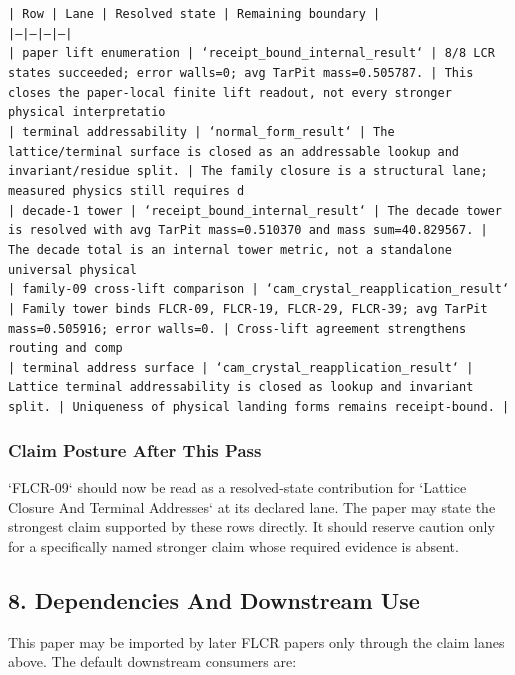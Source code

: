 \documentclass[11pt]{article}
\begin{document}
\noindent\texttt{| Row | Lane | Resolved state | Remaining boundary |}\\
\noindent\texttt{|---|---|---|---|}\\
\noindent\texttt{| paper lift enumeration | `receipt\_bound\_internal\_result` | 8/8 LCR states succeeded; error walls=0; avg TarPit mass=0.505787. | This closes the paper-local finite lift readout, not every stronger physical interpretatio}\\
\noindent\texttt{| terminal addressability | `normal\_form\_result` | The lattice/terminal surface is closed as an addressable lookup and invariant/residue split. | The family closure is a structural lane; measured physics still requires d}\\
\noindent\texttt{| decade-1 tower | `receipt\_bound\_internal\_result` | The decade tower is resolved with avg TarPit mass=0.510370 and mass sum=40.829567. | The decade total is an internal tower metric, not a standalone universal physical }\\
\noindent\texttt{| family-09 cross-lift comparison | `cam\_crystal\_reapplication\_result` | Family tower binds FLCR-09, FLCR-19, FLCR-29, FLCR-39; avg TarPit mass=0.505916; error walls=0. | Cross-lift agreement strengthens routing and comp}\\
\noindent\texttt{| terminal address surface | `cam\_crystal\_reapplication\_result` | Lattice terminal addressability is closed as lookup and invariant split. | Uniqueness of physical landing forms remains receipt-bound. |}\\

\subsubsection*{Claim Posture After This Pass}

`FLCR-09` should now be read as a resolved-state contribution for `Lattice Closure And Terminal Addresses` at its declared lane. The paper may state the strongest claim supported by these rows directly. It should reserve caution only for a specifically named stronger claim whose required evidence is absent.

\subsection*{8. Dependencies And Downstream Use}

This paper may be imported by later FLCR papers only through the claim lanes
above. The default downstream consumers are:
\end{document}

